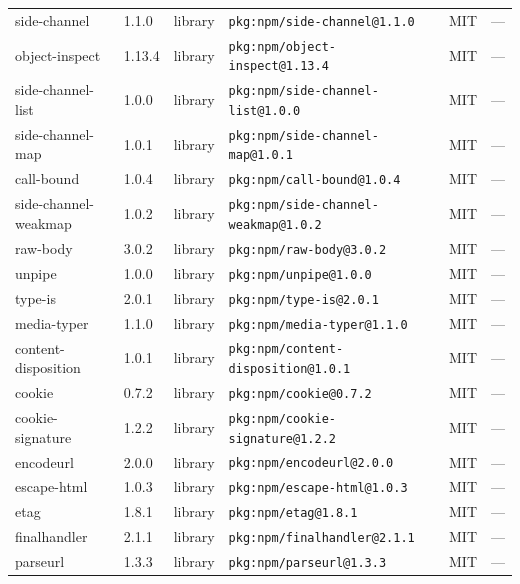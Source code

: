 \documentclass[11pt,a4paper]{article}
\begin{document}
\begin{longtable}{|p{4cm}|p{2cm}|p{1.6cm}|p{5cm}|p{1.5cm}|p{3.5cm}|}
\raggedright side-channel & 1.1.0 & library & \small\texttt{pkg:npm/side-channel@1.1.0} & MIT & \small — \\
\raggedright object-inspect & 1.13.4 & library & \small\texttt{pkg:npm/object-inspect@1.13.4} & MIT & \small — \\
\raggedright side-channel-list & 1.0.0 & library & \small\texttt{pkg:npm/side-channel-list@1.0.0} & MIT & \small — \\
\raggedright side-channel-map & 1.0.1 & library & \small\texttt{pkg:npm/side-channel-map@1.0.1} & MIT & \small — \\
\raggedright call-bound & 1.0.4 & library & \small\texttt{pkg:npm/call-bound@1.0.4} & MIT & \small — \\
\raggedright side-channel-weakmap & 1.0.2 & library & \small\texttt{pkg:npm/side-channel-weakmap@1.0.2} & MIT & \small — \\
\raggedright raw-body & 3.0.2 & library & \small\texttt{pkg:npm/raw-body@3.0.2} & MIT & \small — \\
\raggedright unpipe & 1.0.0 & library & \small\texttt{pkg:npm/unpipe@1.0.0} & MIT & \small — \\
\raggedright type-is & 2.0.1 & library & \small\texttt{pkg:npm/type-is@2.0.1} & MIT & \small — \\
\raggedright media-typer & 1.1.0 & library & \small\texttt{pkg:npm/media-typer@1.1.0} & MIT & \small — \\
\raggedright content-disposition & 1.0.1 & library & \small\texttt{pkg:npm/content-disposition@1.0.1} & MIT & \small — \\
\raggedright cookie & 0.7.2 & library & \small\texttt{pkg:npm/cookie@0.7.2} & MIT & \small — \\
\raggedright cookie-signature & 1.2.2 & library & \small\texttt{pkg:npm/cookie-signature@1.2.2} & MIT & \small — \\
\raggedright encodeurl & 2.0.0 & library & \small\texttt{pkg:npm/encodeurl@2.0.0} & MIT & \small — \\
\raggedright escape-html & 1.0.3 & library & \small\texttt{pkg:npm/escape-html@1.0.3} & MIT & \small — \\
\raggedright etag & 1.8.1 & library & \small\texttt{pkg:npm/etag@1.8.1} & MIT & \small — \\
\raggedright finalhandler & 2.1.1 & library & \small\texttt{pkg:npm/finalhandler@2.1.1} & MIT & \small — \\
\raggedright parseurl & 1.3.3 & library & \small\texttt{pkg:npm/parseurl@1.3.3} & MIT & \small — \\

\end{longtable}
\end{document}
